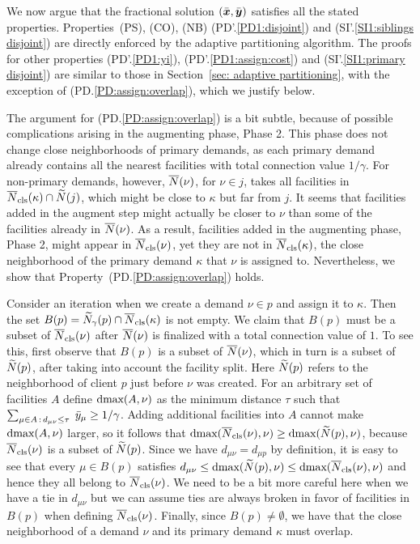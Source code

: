 \smallskip

We now argue that the fractional solution $(\bar{\boldsymbol{x}},\bar{\boldsymbol{y}})$
satisfies all the stated properties. Properties~(PS), (CO), (NB)
(PD'.\ref{PD1:disjoint}) and (SI'.\ref{SI1:siblings disjoint}) are
directly enforced by the adaptive partitioning algorithm. The proofs
for other properties (PD'.\ref{PD1:yi}), (PD'.\ref{PD1:assign:cost})
and (SI'.\ref{SI1:primary disjoint}) are similar to those in
Section~\ref{sec: adaptive partitioning}, with the exception of
(PD.\ref{PD:assign:overlap}), which we justify below.

The argument for (PD.\ref{PD:assign:overlap}) is a bit subtle, because
of possible complications arising in the augmenting phase, Phase 2.
This phase does not change close neighborhoods of primary demands, as
each primary demand already contains all the nearest facilities with
total connection value $1/\gamma$.  For non-primary demands, however,
${\overline{N}}(\nu)$, for $\nu\in j$, takes all facilities in
${\overline{N}}_{\text{cls}}(\kappa)\cap {\widetilde N}(j)$, which might be close to $\kappa$
but far from $j$.  It seems that facilities added in the augment step
might actually be closer to $\nu$ than some of the facilities already
in ${\overline{N}}(\nu)$. As a result, facilities added in the augmenting
phase, Phase 2, might appear in ${\overline{N}}_{\text{cls}}(\nu)$, yet they are not in
${\overline{N}}_{\text{cls}}(\kappa)$, the close neighborhood of the primary demand
$\kappa$ that $\nu$ is assigned to.  Nevertheless, we show that
Property~(PD.\ref{PD:assign:overlap}) holds.

Consider an iteration when we create a demand $\nu\in p$
and assign it to $\kappa$. Then the set
$B(p)={\widetilde N}_{\gamma}(p)\cap {\overline{N}}_{\text{cls}}(\kappa)$ is not empty.
We claim that
$B(p)$ must be a subset of ${\overline{N}}_{\text{cls}}(\nu)$ after ${\overline{N}}(\nu)$ is
finalized with a total connection value of $1$. To see this, first
observe that $B(p)$ is a subset of ${\overline{N}}(\nu)$, which in turn is a
subset of ${\widetilde N}(p)$, after taking into account the facility
split. Here ${\widetilde N}(p)$ refers to the neighborhood of client $p$
just before $\nu$ was created. For an arbitrary set of facilities
$A$ define $\text{dmax}(A, \nu)$ as the minimum distance $\tau$ such
that $\sum_{\mu\in A {\,:\,} d_{\mu\nu} \leq \tau}\;{\bar y}_{\mu} \geq
1/\gamma$.
Adding additional facilities into $A$ cannot make
$\text{dmax}(A, \nu)$ larger, so it follows that $\text{dmax}({\overline{N}}_{\text{cls}}(\nu), \nu)
\geq \text{dmax}({\widetilde N}(p), \nu)$, because ${\overline{N}}_{\text{cls}}(\nu)$ is a subset of
${\widetilde N}(p)$. Since we have $d_{\mu \nu} = d_{\mu p}$ by definition,
it is easy to see that every $\mu \in B(p)$ satisfies $d_{\mu \nu}
\leq \text{dmax}({\widetilde N}(p), \nu) \leq \text{dmax}({\overline{N}}_{\text{cls}}(\nu), \nu)$ and
hence they all belong to ${\overline{N}}_{\text{cls}}(\nu)$. We need to be a bit more
careful here when we have a tie in $d_{\mu\nu}$ but we can assume ties
are always broken in favor of facilities in $B(p)$ when defining
${\overline{N}}_{\text{cls}}(\nu)$. Finally, since $B(p)\neq\emptyset$, we have that the
close neighborhood of a demand $\nu$ and its primary demand $\kappa$
must overlap.

